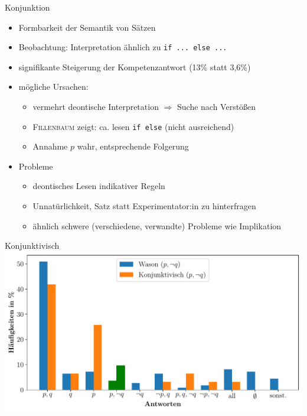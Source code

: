 \begin{frame}{Konjunktion {\scriptsize \cite[S.~107-109]{stenningHumanReasoningCognitive2008}}}
    \begin{itemize}
        \item Formbarkeit der Semantik von Sätzen
        \item Beobachtung: Interpretation ähnlich zu \texttt{if ... else ...}
        \item signifikante Steigerung der Kompetenzantwort {\small (13\% statt 3,6\%)}
        
        \item mögliche Ursachen:
        \begin{itemize}
            \item vermehrt deontische Interpretation $\Rightarrow$ Suche nach Verstößen
            \item \textsc{Fillenbaum} zeigt: ca.  lesen \texttt{if else} {\small (nicht ausreichend)}
            \item Annahme $p$ wahr, entsprechende Folgerung
        \end{itemize}
        
        \item Probleme
        \begin{itemize}
            \item deontisches Lesen indikativer Regeln
            \item Unnatürlichkeit, Satz statt Experimentator:in zu hinterfragen
            \item ähnlich schwere (verschiedene, verwandte) Probleme wie Implikation
        \end{itemize}
    \end{itemize}
\end{frame}


\begin{frame}{Konjunktivisch {\scriptsize \cite[S.~109]{stenningHumanReasoningCognitive2008}}}
    \includegraphics[width=\textwidth]{../plot/results_subjunctive.pdf}
\end{frame}


